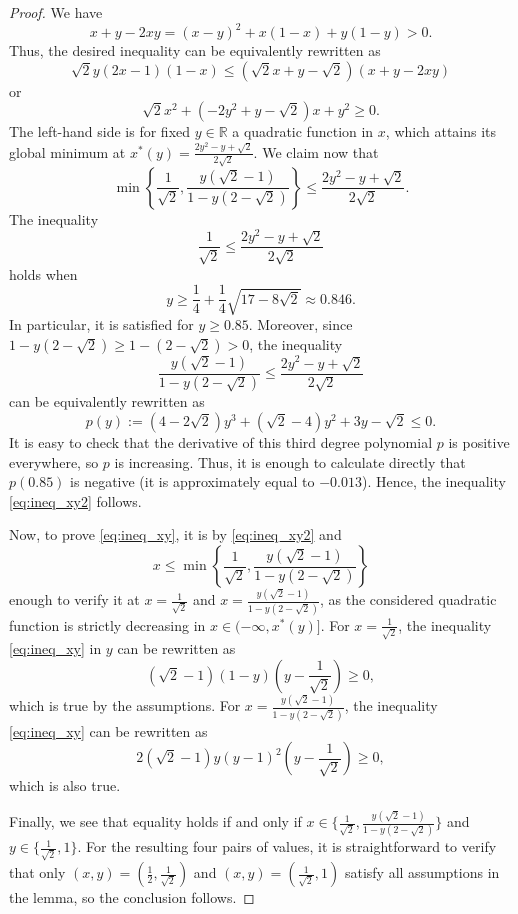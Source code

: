 \documentclass[12pt,a4paper]{article}
\theoremstyle{definition}
\newcommand\R{\mathbb{R}}
\begin{document}
\begin{proof}
We have
$$ x + y -2xy = (x-y)^2 + x (1-x) + y (1-y) > 0. $$
Thus, the desired inequality can be equivalently rewritten as
$$\sqrt{2}y(2x-1)(1-x) \leq (\sqrt{2} x + y - \sqrt{2})(x+y-2xy)$$
or
\begin{equation}
\label{eq:ineq_xy}
\sqrt{2}x^2 + (-2y^2 + y - \sqrt{2})x + y^2 \geq 0.
\end{equation}
The left-hand side is for fixed $y \in \R$ a quadratic function in $x$, which attains its global minimum at $x^*(y) = \frac{2y^2-y+\sqrt{2}}{2\sqrt{2}}$. We claim now that
\begin{equation}
\label{eq:ineq_xy2}
\min \left\{ \frac{1}{\sqrt{2}}, \frac{y(\sqrt{2}-1)}{1-y(2-\sqrt{2})} \right\} \leq \frac{2y^2-y+\sqrt{2}}{2\sqrt{2}}.
\end{equation}
The inequality 
$$ \frac{1}{\sqrt{2}} \leq \frac{2y^2-y+\sqrt{2}}{2\sqrt{2}} $$
holds when
$$y \geq \frac{1}{4} + \frac{1}{4} \sqrt{17 - 8 \sqrt{2}} \approx 0.846.$$
In particular, it is satisfied for $y \geq 0.85$. Moreover, since $1-y(2-\sqrt{2}) \geq 1 - (2-\sqrt{2}) > 0$, the inequality
$$ \frac{y(\sqrt{2}-1)}{1-y(2-\sqrt{2})} \leq \frac{2y^2-y+\sqrt{2}}{2\sqrt{2}} $$
can be equivalently rewritten as
$$ p(y) := (4-2\sqrt{2}) y^3 +  (\sqrt{2}-4) y^2 + 3y - \sqrt{2} \leq 0. $$
It is easy to check that the derivative of this third degree polynomial $p$ is positive everywhere, so $p$ is increasing. Thus, it is enough to calculate directly that $p(0.85)$ is negative (it is approximately equal to $-0.013$). Hence, the inequality \eqref{eq:ineq_xy2} follows.

Now, to prove \eqref{eq:ineq_xy}, it is by \eqref{eq:ineq_xy2} and
$$x \leq \min \left\{ \frac{1}{\sqrt{2}}, \frac{y(\sqrt{2}-1)}{1-y(2-\sqrt{2})} \right\}$$
enough to verify it at $x = \frac{1}{\sqrt{2}}$ and $x=\frac{y(\sqrt{2}-1)}{1-y(2-\sqrt{2})}$, as the considered quadratic function is strictly decreasing in $x\in (-\infty,x^*(y)]$. For $x = \frac{1}{\sqrt{2}}$, the inequality \eqref{eq:ineq_xy} in $y$ can be rewritten as
$$(\sqrt{2}-1)(1-y)\left ( y - \frac{1}{\sqrt{2}} \right ) \geq 0,$$
which is true by the assumptions. For $x = \frac{y(\sqrt{2}-1)}{1-y(2-\sqrt{2})}$, the inequality \eqref{eq:ineq_xy} can be rewritten as
$$ 2 (\sqrt{2}-1)y(y-1)^2 \left( y-\frac{1}{\sqrt{2}} \right) \geq 0, $$
which is also true.

Finally, we see that equality holds if and only if $x \in \{ \frac{1}{\sqrt{2}}, \frac{y(\sqrt{2}-1)}{1-y(2-\sqrt{2})} \}$ and $y \in \{ \frac{1}{\sqrt{2}}, 1 \}$. For the resulting four pairs of values, it is straightforward to verify that only $(x,y) = ( \frac{1}{2}, \frac{1}{\sqrt{2}} )$ and $(x,y) = ( \frac{1}{\sqrt{2}},1 )$ satisfy all assumptions in the lemma, so the conclusion follows.
\end{proof}
\end{document}
